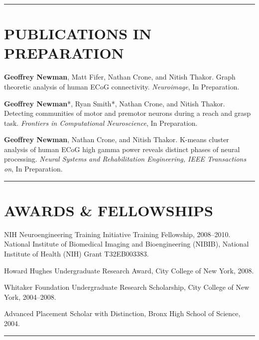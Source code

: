 \documentclass[margin]{res}
\begin{document}
\begin{resume}
\rule{\linewidth}{1mm}  %

\section{\MakeUppercase{Publications in Preparation}}

\textbf{Geoffrey Newman}, Matt Fifer, Nathan Crone, and Nitish Thakor. Graph theoretic analysis of human ECoG connectivity. \textit{Neuroimage}, In Preparation.

\textbf{Geoffrey Newman}*, Ryan Smith*, Nathan Crone, and Nitish Thakor. Detecting communities of motor and premotor neurons during a reach and grasp task. \textit{Frontiers in Computational Neuroscience}, In Preparation.

\textbf{Geoffrey Newman}, Nathan Crone, and Nitish Thakor. K-means cluster analysis of human ECoG high gamma power reveals distinct phases of neural processing. \textit{Neural Systems and Rehabilitation Engineering, IEEE Transactions on}, In Preparation.

\rule{\linewidth}{1mm}  %

\section{\MakeUppercase{Awards \& Fellowships}}

NIH Neuroengineering Training Initiative Training Fellowship, 2008--2010.
National Institute of Biomedical Imaging and Bioengineering (NIBIB), National Institute of Health (NIH) Grant
T32EB003383.

Howard Hughes Undergraduate Research Award, City College of New York, 2008.

Whitaker Foundation Undergraduate Research Scholarship, City College of New York, 2004--2008.

Advanced Placement Scholar with Distinction, Bronx High School of Science, 2004.

\rule{\linewidth}{1mm}  %
%
%
%


\end{resume}
\end{document}

